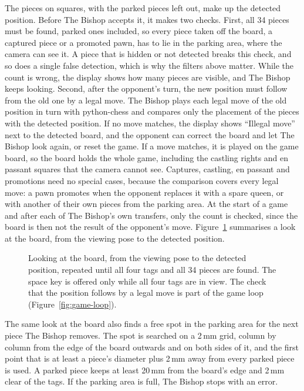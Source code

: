 The pieces on squares, with the parked pieces left out, make up the detected position.
Before The Bishop accepts it, it makes two checks.
First, all 34 pieces must be found, parked ones included, so every piece taken off the board, a captured piece or a promoted pawn, has to lie in the parking area, where the camera can see it.
A piece that is hidden or not detected breaks this check, and so does a single false detection, which is why the filters above matter.
While the count is wrong, the display shows how many pieces are visible, and The Bishop keeps looking.
Second, after the opponent's turn, the new position must follow from the old one by a legal move.
The Bishop plays each legal move of the old position in turn with python-chess and compares only the placement of the pieces with the detected position.
If no move matches, the display shows ``Illegal move'' next to the detected board, and the opponent can correct the board and let The Bishop look again, or reset the game.
If a move matches, it is played on the game board, so the board holds the whole game, including the castling rights and en passant squares that the camera cannot see.
Captures, castling, en passant and promotions need no special cases, because the comparison covers every legal move: a pawn promotes when the opponent replaces it with a spare queen, or with another of their own pieces from the parking area.
At the start of a game and after each of The Bishop's own transfers, only the count is checked, since the board is then not the result of the opponent's move.
Figure~\ref{fig:vision} summarises a look at the board, from the viewing pose to the detected position.

\begin{figure}[htbp]
  \centering
  
  \caption{Looking at the board, from the viewing pose to the detected position, repeated until all four tags and all 34 pieces are found.
    The space key is offered only while all four tags are in view.
    The check that the position follows by a legal move is part of the game loop (Figure~\ref{fig:game-loop}).}
  \label{fig:vision}
\end{figure}

The same look at the board also finds a free spot in the parking area for the next piece The Bishop removes.
The spot is searched on a 2\,mm grid, column by column from the edge of the board outwards and on both sides of it, and the first point that is at least a piece's diameter plus 2\,mm away from every parked piece is used.
A parked piece keeps at least 20\,mm from the board's edge and 2\,mm clear of the tags.
If the parking area is full, The Bishop stops with an error.

